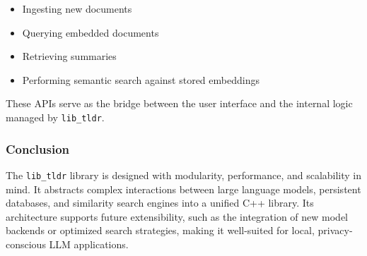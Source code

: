 \begin{itemize}
    \item Ingesting new documents
    \item Querying embedded documents
    \item Retrieving summaries
    \item Performing semantic search against stored embeddings
\end{itemize}

These APIs serve as the bridge between the user interface and the internal logic managed by \texttt{lib\_tldr}.

\subsubsection{Conclusion}

The \texttt{lib\_tldr} library is designed with modularity, performance, and scalability in mind. It abstracts complex interactions between large language models, persistent databases, and similarity search engines into a unified C++ library. Its architecture supports future extensibility, such as the integration of new model backends or optimized search strategies, making it well-suited for local, privacy-conscious LLM applications.



